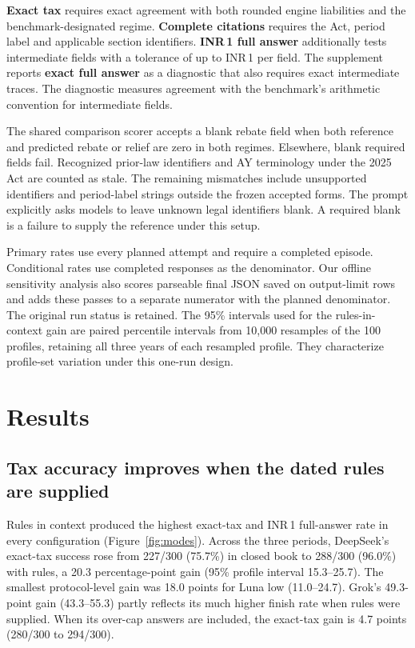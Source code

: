 \documentclass[10pt,letterpaper,twocolumn]{article}
\begin{document}
\textbf{Exact tax} requires exact agreement with both rounded engine liabilities and the benchmark-designated regime. \textbf{Complete citations} requires the Act, period label and applicable section identifiers. \textbf{INR\,1 full answer} additionally tests intermediate fields with a tolerance of up to INR\,1 per field. The supplement reports \textbf{exact full answer} as a diagnostic that also requires exact intermediate traces. The diagnostic measures agreement with the benchmark's arithmetic convention for intermediate fields.

The shared comparison scorer accepts a blank rebate field when both reference and predicted rebate or relief are zero in both regimes. Elsewhere, blank required fields fail. Recognized prior-law identifiers and AY terminology under the 2025 Act are counted as stale. The remaining mismatches include unsupported identifiers and period-label strings outside the frozen accepted forms. The prompt explicitly asks models to leave unknown legal identifiers blank. A required blank is a failure to supply the reference under this setup.

Primary rates use every planned attempt and require a completed episode. Conditional rates use completed responses as the denominator. Our offline sensitivity analysis also scores parseable final JSON saved on output-limit rows and adds these passes to a separate numerator with the planned denominator. The original run status is retained. The 95\% intervals used for the rules-in-context gain are paired percentile intervals from 10,000 resamples of the 100 profiles, retaining all three years of each resampled profile. They characterize profile-set variation under this one-run design.

\section{Results}

\subsection{Tax accuracy improves when the dated rules are supplied}

Rules in context produced the highest exact-tax and INR\,1 full-answer rate in every configuration (Figure~\ref{fig:modes}). Across the three periods, DeepSeek's exact-tax success rose from 227/300 (75.7\%) in closed book to 288/300 (96.0\%) with rules, a 20.3 percentage-point gain (95\% profile interval 15.3--25.7). The smallest protocol-level gain was 18.0 points for Luna low (11.0--24.7). Grok's 49.3-point gain (43.3--55.3) partly reflects its much higher finish rate when rules were supplied. When its over-cap answers are included, the exact-tax gain is 4.7 points (280/300 to 294/300).
\end{document}

